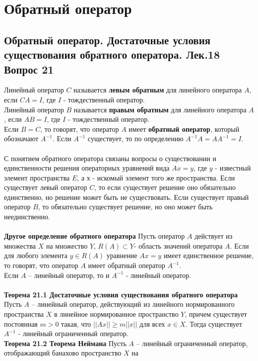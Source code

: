 \documentclass{article}
\begin{document}
\section{Обратный оператор}
\subsection{Обратный оператор. Достаточные условия существования обратного оператора. Лек.18 \textbf{Вопрос 21}}
	Линейный оператор $C$ называется \textbf{левым обратным} для линейного
	оператора $A$, если $CA=I$, где $I$ - тождественный оператор.\\
	Линейный оператор $B$ называется \textbf{правым обратным} для линейного оператора $A$, если $AB=I$, где $I$ - тождественный оператор.\\
	Если $B=C$, то говорят, что оператор $A$ имеет
	\textbf{обратный оператор}, который обозначают ${A}^{-1}$. Если ${A}^{-1}$ существует, то по определению ${A}^{-1}A=A{A}^{-1}=I$.\\
	\\
	С понятием обратного оператора связаны вопросы о
	существовании и единственности решения операторных уравнений
	вида $Ax=y$, где $y$ - известный элемент пространства $E$, а $х$ - искомый элемент того же пространства. Если существует левый оператор $C$, то если существует решение оно обязательно единственно, но решение может быть не существовать. Если существует правый оператор $B$, то обязательно существует решение, но оно может быть неединственно.\\
	\\
	\textbf{Другое определение обратного оператора} Пусть оператор $A$ действует из множества $X$ на множество $Y$,
	$R(A)\subset Y$- область значений оператора $A$. Если для любого элемента $y\in R(A)$ уравнение $Ax=y$ имеет единственное решение, то говорят, что оператор $A$ имеет обратный оператор ${A}^{-1}$.\\
	Если $A$ – линейный оператор, то и ${A}^{-1}$ - линейный оператор.\\
	\\
	\textbf{Теорема 21.1 Достаточные условия существования обратного оператора} Пусть $A$ – линейный оператор, действующий из
	линейного нормированного пространства $X$ в линейное
	нормированное пространство $Y$, причем существует постоянная $m>0$
	такая, что $||Ax||\ge m||x||$ для всех $x\in X$. Тогда существует ${A}^{-1}$ - линейный ограниченный оператор.\\
	\textbf{Теорема 21.2 Теорема Неймана} Пусть $A$ – линейный
	ограниченный оператор, отображающий банахово пространство $X$ на
\end{document}
